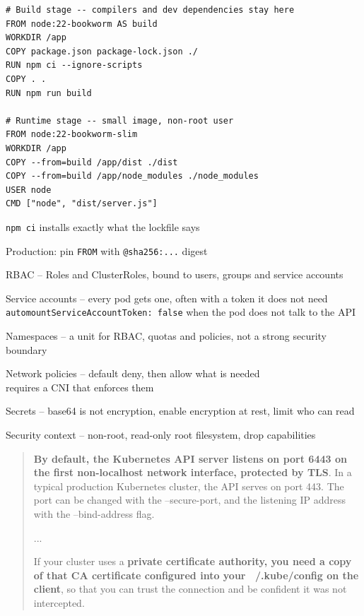 \documentclass[Screen16to9,17pt]{foils}
\begin{document}

\begin{verbatim}
# Build stage -- compilers and dev dependencies stay here
FROM node:22-bookworm AS build
WORKDIR /app
COPY package.json package-lock.json ./
RUN npm ci --ignore-scripts
COPY . .
RUN npm run build

# Runtime stage -- small image, non-root user
FROM node:22-bookworm-slim
WORKDIR /app
COPY --from=build /app/dist ./dist
COPY --from=build /app/node_modules ./node_modules
USER node
CMD ["node", "dist/server.js"]
\end{verbatim}

\begin{list2}
\item \verb+npm ci+ installs exactly what the lockfile says
\item Production: pin \verb+FROM+ with \verb+@sha256:...+ digest
\end{list2}



\begin{list2}
\item RBAC -- Roles and ClusterRoles, bound to users, groups and service accounts
\item Service accounts -- every pod gets one, often with a token it does not need\\
\verb+automountServiceAccountToken: false+ when the pod does not talk to the API
\item Namespaces -- a unit for RBAC, quotas and policies, not a strong security boundary
\item Network policies -- default deny, then allow what is needed\\
requires a CNI that enforces them
\item Secrets -- base64 is not encryption, enable encryption at rest, limit who can read
\item Security context -- non-root, read-only root filesystem, drop capabilities
\end{list2}

{\footnotesize{}}


\begin{quote}{\bf
By default, the Kubernetes API server listens on port 6443 on the first non-localhost network interface, protected by TLS}. In a typical production Kubernetes cluster, the API serves on port 443. The port can be changed with the --secure-port, and the listening IP address with the --bind-address flag.

...

If your cluster uses a {\bf private certificate authority, you need a copy of that CA certificate configured into your ~/.kube/config on the client}, so that you can trust the connection and be confident it was not intercepted.
\end{quote}
\end{document}
